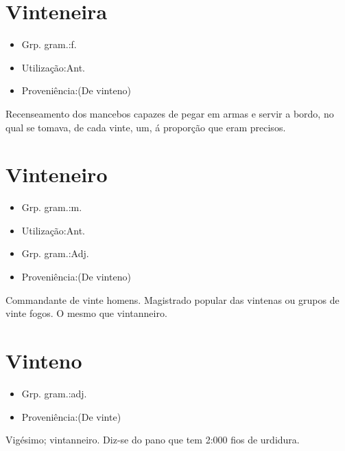 \documentclass{article}
\begin{document}
\section{Vinteneira}
\begin{itemize}
\item {Grp. gram.:f.}
\end{itemize}
\begin{itemize}
\item {Utilização:Ant.}
\end{itemize}
\begin{itemize}
\item {Proveniência:(De \textunderscore vinteno\textunderscore )}
\end{itemize}
Recenseamento dos mancebos capazes de pegar em armas e servir a bordo, no qual se tomava, de cada vinte, um, á proporção que eram precisos.
\section{Vinteneiro}
\begin{itemize}
\item {Grp. gram.:m.}
\end{itemize}
\begin{itemize}
\item {Utilização:Ant.}
\end{itemize}
\begin{itemize}
\item {Grp. gram.:Adj.}
\end{itemize}
\begin{itemize}
\item {Proveniência:(De \textunderscore vinteno\textunderscore )}
\end{itemize}
Commandante de vinte homens.
Magistrado popular das vintenas ou grupos de vinte fogos.
O mesmo que \textunderscore vintanneiro\textunderscore .
\section{Vinteno}
\begin{itemize}
\item {Grp. gram.:adj.}
\end{itemize}
\begin{itemize}
\item {Proveniência:(De \textunderscore vinte\textunderscore )}
\end{itemize}
Vigésimo; vintanneiro.
Diz-se do pano que tem 2:000 fios de urdidura.
\end{document}
